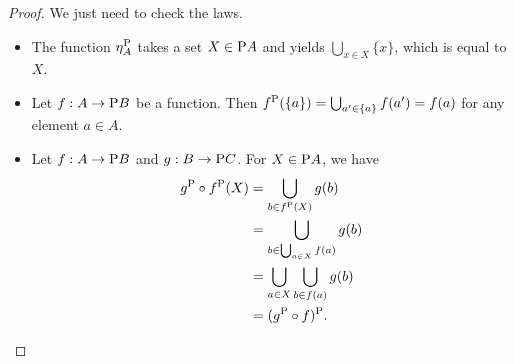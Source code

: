 \documentclass[DynamicalBook]{subfiles}
\begin{document}
\begin{proof}
  We just need to check the laws.
  \begin{itemize}
    \item The function $\eta_A^{\mathrm{P}}$ takes a set $X \in \mathrm{P} A$ and
      yields $\bigcup_{x \in X} \{x\}$, which is equal to $X$.
    \item Let $f : A \to \mathrm{P} B$ be a function. Then $f^{\mathrm{P}}(\{a\}) =
      \bigcup_{a' \in \{a\}}f(a') = f(a)$ for any element $a \in A$.
    \item Let $f : A \to \mathrm{P} B$ and $g : B \to \mathrm{P} C$. For $X \in
      \mathrm{P} A$, we have
\begin{align*}
  g^{\mathrm{P}} \circ f^{\mathrm{P}}(X) &= \bigcup_{b \in f^{\mathrm{P}}(X)} g(b) \\
&= \bigcup_{b \in \bigcup_{a \in X} f(a)} g(b) \\
&= \bigcup_{a \in X} \bigcup_{b \in f(a)} g(b) \\
&= (g^{\mathrm{P}} \circ f)^{\mathrm{P}}.
\end{align*}
  \end{itemize}
  

\end{proof}
\end{document}
